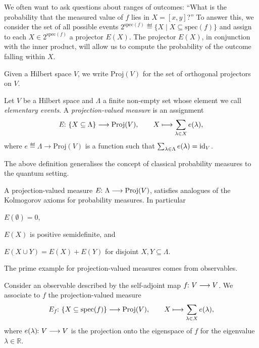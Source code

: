 \documentclass[a4paper, oneside, 12pt]{amsart}
\begin{document}
We often want to ask questions about ranges of outcomes:
``What is the probability that the measured value of \( f \) lies in  \(X=[x,y]\)?''
To answer this, we consider the set of all possible events \(2^{\mathrm{spec}(f)}\eqdef\{ X \mid X \subseteq \mathrm{spec}(f)\}\) and assign to each \(X \in 2^{\mathrm{spec}(f)}\)  a projector \(E(X)\).
The projector \(E(X)\), in conjunction with the inner product, will allow us to compute the probability of the outcome falling within \(X\).
\bigskip

Given a Hilbert space \(V\), we write \(\mathrm{Proj}(V)\) for the set of orthogonal projectors on \(V\).

\begin{definition}\label{def:projective-measurement}
  Let \( V \) be a Hilbert space and \(\Lambda\) a finite non-empty set whose element we call \emph{elementary events}.
  A \emph{projection-valued measure} is an assignment
  \begin{equation*}
    E \from \{ X \subseteq \Lambda\} \to \mathrm{Proj}(V), \qquad X \mapsto \sum_{\lambda\in X} e(\lambda),
  \end{equation*}
  where \(e \eqdef \Lambda \to\mathrm{Proj}(V)\) is a function such that \(\sum_{\lambda\in \Lambda} e(\lambda) = \mathrm{id}_{V}\).
\end{definition}

The above definition generalises the concept of classical probability measures to the quantum setting.

\begin{remark}\label{rmk:consequences-of-projective-measurement}
  A projection-valued measure \(E \from \Lambda \to\text{Proj}(V)\), satisfies analogues of the Kolmogorov axioms for probability measures.
  In particular
  \begin{thmlist}
    \item \(E(\emptyset) = 0\),
    \item \(E(X)\) is positive semidefinite, and
    \item \(E(X \cup Y)= E(X) + E(Y)\) for disjoint \(X, Y \subseteq \Lambda\).
  \end{thmlist}
\end{remark}
The prime example for projection-valued measures comes from observables.

\begin{example}\label{ex:pvm-from-observable}
  Consider an observable described by the self-adjoint map \(f\from V \to V\).
  We associate to \(f\) the projection-valued measure
  \begin{equation*}
    E_{f} \from\{X \subseteq \mathrm{spec}(f)\} \to \mathrm{Proj}(V), \qquad X \mapsto \sum_{\lambda\in X} e(\lambda),
  \end{equation*}
  where \(e(\lambda) \from V\to V\) is the projection onto the eigenspace of \(f\) for the eigenvalue \(\lambda \in \mathbb{R}\).
\end{example}
\end{document}

